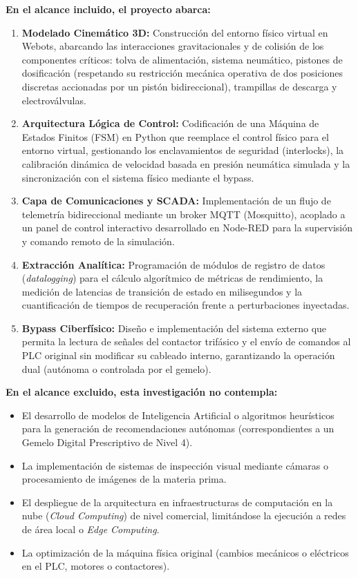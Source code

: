 \textbf{En el alcance incluido, el proyecto abarca:}
\begin{enumerate}
  \item \textbf{Modelado Cinemático 3D:} Construcción del entorno físico virtual en Webots, abarcando las interacciones gravitacionales y de colisión de los componentes críticos: tolva de alimentación, sistema neumático, pistones de dosificación (respetando su restricción mecánica operativa de dos posiciones discretas accionadas por un pistón bidireccional), trampillas de descarga y electroválvulas.
  \item \textbf{Arquitectura Lógica de Control:} Codificación de una Máquina de Estados Finitos (FSM) en Python que reemplace el control físico para el entorno virtual, gestionando los enclavamientos de seguridad (interlocks), la calibración dinámica de velocidad basada en presión neumática simulada y la sincronización con el sistema físico mediante el bypass.
  \item \textbf{Capa de Comunicaciones y SCADA:} Implementación de un flujo de telemetría bidireccional mediante un broker MQTT (Mosquitto), acoplado a un panel de control interactivo desarrollado en Node-RED para la supervisión y comando remoto de la simulación.
  \item \textbf{Extracción Analítica:} Programación de módulos de registro de datos (\textit{datalogging}) para el cálculo algorítmico de métricas de rendimiento, la medición de latencias de transición de estado en milisegundos y la cuantificación de tiempos de recuperación frente a perturbaciones inyectadas.
  \item \textbf{Bypass Ciberfísico:} Diseño e implementación del sistema externo que permita la lectura de señales del contactor trifásico y el envío de comandos al PLC original sin modificar su cableado interno, garantizando la operación dual (autónoma o controlada por el gemelo).
\end{enumerate}

\textbf{En el alcance excluido, esta investigación no contempla:}
\begin{itemize}
  \item El desarrollo de modelos de Inteligencia Artificial o algoritmos heurísticos para la generación de recomendaciones autónomas (correspondientes a un Gemelo Digital Prescriptivo de Nivel 4).
  \item La implementación de sistemas de inspección visual mediante cámaras o procesamiento de imágenes de la materia prima.
  \item El despliegue de la arquitectura en infraestructuras de computación en la nube (\textit{Cloud Computing}) de nivel comercial, limitándose la ejecución a redes de área local o \textit{Edge Computing}.
  \item La optimización de la máquina física original (cambios mecánicos o eléctricos en el PLC, motores o contactores).
\end{itemize}

